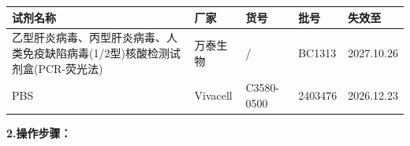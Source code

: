 \documentclass[UTF8,10pt,a4paper,fontset=fandol]{ctexart}
\newcommand{\fieldvalue}[1]{#1}
\newcommand{\handwritten}[1]{#1}
\begin{document}
\begin{tabular}{|p{6.3cm}|p{3.0cm}|p{3.0cm}|p{3.0cm}|p{2.4cm}|}
\hline
试剂名称 & 厂家 & 货号 & 批号 & 失效至 \\
\hline
乙型肝炎病毒、丙型肝炎病毒、人类免疫缺陷病毒(1/2型)核酸检测试剂盒(PCR-荧光法) &
\fieldvalue{万泰生物} &
\fieldvalue{\handwritten{/}} &
\fieldvalue{\handwritten{BC1313}} &
\fieldvalue{\handwritten{2027.10.26}}
\\ \hline
PBS &
\fieldvalue{Vivacell} &
\fieldvalue{C3580-0500} &
\fieldvalue{\handwritten{2403476}} &
\fieldvalue{\handwritten{2026.12.23}}
\\ \hline
\end{tabular}

\textbf{2.\quad 操作步骤：}
\end{document}
